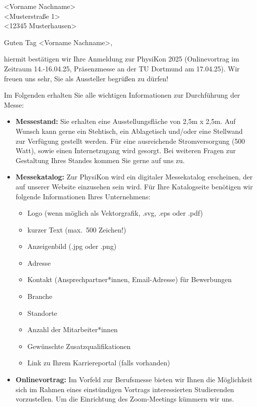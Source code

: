 \documentclass[
  pepbrief,
  fontsize=12pt,
  paper=a4,
  DIV=14,
  parskip=half,
  backaddress=false,
]{scrlttr2}
\author{Das PhysiKon Team}
\begin{document}
\begin{letter}{%
  <Vorname Nachname>\\
  <Musterstraße 1> \\
  <12345 Musterhausen>
}
\opening{Guten Tag <Vorname Nachname>,}
hiermit bestätigen wir Ihre Anmeldung zur PhysiKon 2025 (Onlinevortrag im Zeitraum 14.-16.04.25, 
Präsenzmesse an der TU Dortmund am 17.04.25). 
Wir freuen uns sehr, Sie als Aussteller begrüßen zu dürfen!

Im Folgenden erhalten Sie alle wichtigen Informationen zur Durchführung der Messe:

\begin{itemize}
  \item \textbf{Messestand:} Sie erhalten eine Ausstellungsfläche von 2,5m x 2,5m.
    Auf Wunsch kann gerne ein Stehtisch, ein Ablagetisch und/oder eine Stellwand 
    zur Verfügung gestellt werden.
    Für eine ausreichende Stromversorgung (500 Watt), sowie einen Internetzugang wird gesorgt.
    Bei weiteren Fragen zur Gestaltung Ihres Standes kommen Sie gerne auf uns zu.
    \item \textbf{Messekatalog:} Zur PhysiKon wird ein digitaler Messekatalog erscheinen, der auf unserer Website 
    einzusehen sein wird.
    Für Ihre Katalogseite benötigen wir folgende Informationen Ihres Unternehmens:
    \begin{itemize}
      \item Logo (wenn möglich als Vektorgrafik, .svg, .eps oder .pdf)
      \item kurzer Text (max.\ 500 Zeichen!)
      \item Anzeigenbild (.jpg oder .png)
      \item Adresse
      \item Kontakt (Ansprechpartner*innen, Email-Adresse) für Bewerbungen
      \item Branche
      \item Standorte
      \item Anzahl der Mitarbeiter*innen
      \item Gewünschte Zusatzqualifikationen
      \item Link zu Ihrem Karriereportal (falls vorhanden)
    \end{itemize}
    \item \textbf{Onlinevortrag:} Im Vorfeld zur Berufsmesse bieten wir Ihnen die Möglichkeit sich im Rahmen eines einstündigen Vortrags interessierten
    Studierenden vorzustellen. Um die Einrichtung des Zoom-Meetings kümmern wir uns. 

\end{itemize}
\end{letter}
\end{document}
